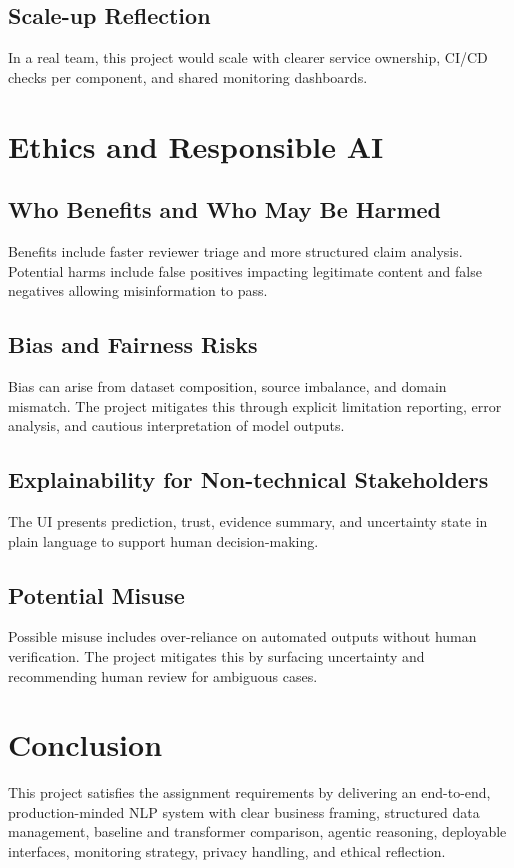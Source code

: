 \documentclass[11pt,a4paper]{article}
\begin{document}
\subsection{Scale-up Reflection}
In a real team, this project would scale with clearer service ownership, CI/CD checks per component, and shared monitoring dashboards.

\section{Ethics and Responsible AI}
\subsection{Who Benefits and Who May Be Harmed}
Benefits include faster reviewer triage and more structured claim analysis. Potential harms include false positives impacting legitimate content and false negatives allowing misinformation to pass.

\subsection{Bias and Fairness Risks}
Bias can arise from dataset composition, source imbalance, and domain mismatch. The project mitigates this through explicit limitation reporting, error analysis, and cautious interpretation of model outputs.

\subsection{Explainability for Non-technical Stakeholders}
The UI presents prediction, trust, evidence summary, and uncertainty state in plain language to support human decision-making.

\subsection{Potential Misuse}
Possible misuse includes over-reliance on automated outputs without human verification. The project mitigates this by surfacing uncertainty and recommending human review for ambiguous cases.

\section{Conclusion}
This project satisfies the assignment requirements by delivering an end-to-end, production-minded NLP system with clear business framing, structured data management, baseline and transformer comparison, agentic reasoning, deployable interfaces, monitoring strategy, privacy handling, and ethical reflection.
\end{document}
